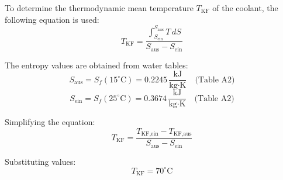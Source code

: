 To determine the thermodynamic mean temperature \( T_{\text{KF}} \) of the coolant, the following equation is used:  
\[
T_{\text{KF}} = \frac{\int_{S_{\text{ein}}}^{S_{\text{aus}}} T \, dS}{S_{\text{aus}} - S_{\text{ein}}}
\]  

The entropy values are obtained from water tables:  
\[
S_{\text{aus}} = S_f(15^\circ\text{C}) = 0.2245 \, \frac{\text{kJ}}{\text{kg·K}} \quad \text{(Table A2)}
\]  
\[
S_{\text{ein}} = S_f(25^\circ\text{C}) = 0.3674 \, \frac{\text{kJ}}{\text{kg·K}} \quad \text{(Table A2)}
\]  

Simplifying the equation:  
\[
T_{\text{KF}} = \frac{T_{\text{KF,ein}} - T_{\text{KF,aus}}}{S_{\text{aus}} - S_{\text{ein}}}
\]  

Substituting values:  
\[
T_{\text{KF}} = 70^\circ\text{C}
\]